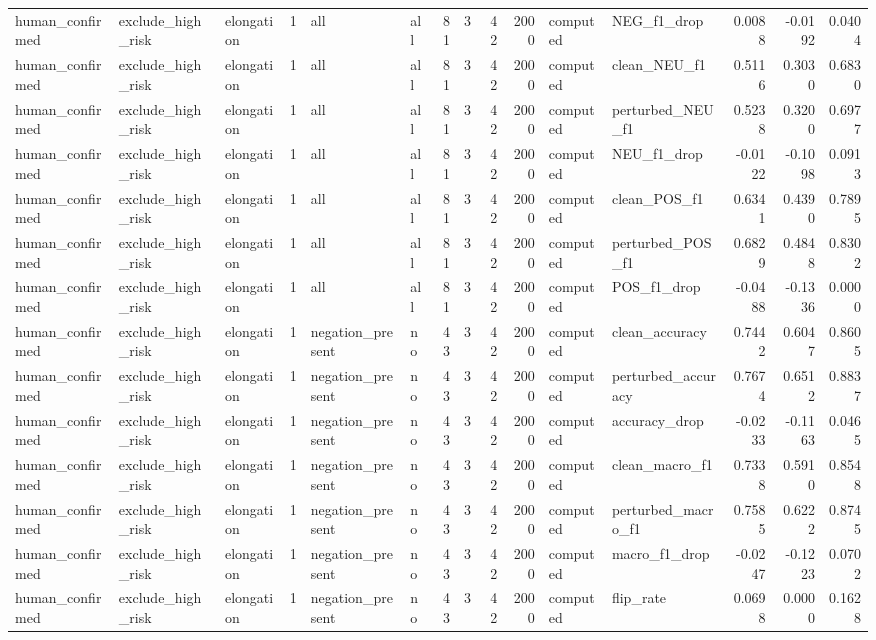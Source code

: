 \begin{tabular}{lllrllrrrrllrrr}
human_confirmed & exclude_high_risk & elongation & 1 & all & all & 81 & 3 & 42 & 2000 & computed & NEG_f1_drop & 0.0088 & -0.0192 & 0.0404 \\
human_confirmed & exclude_high_risk & elongation & 1 & all & all & 81 & 3 & 42 & 2000 & computed & clean_NEU_f1 & 0.5116 & 0.3030 & 0.6830 \\
human_confirmed & exclude_high_risk & elongation & 1 & all & all & 81 & 3 & 42 & 2000 & computed & perturbed_NEU_f1 & 0.5238 & 0.3200 & 0.6977 \\
human_confirmed & exclude_high_risk & elongation & 1 & all & all & 81 & 3 & 42 & 2000 & computed & NEU_f1_drop & -0.0122 & -0.1098 & 0.0913 \\
human_confirmed & exclude_high_risk & elongation & 1 & all & all & 81 & 3 & 42 & 2000 & computed & clean_POS_f1 & 0.6341 & 0.4390 & 0.7895 \\
human_confirmed & exclude_high_risk & elongation & 1 & all & all & 81 & 3 & 42 & 2000 & computed & perturbed_POS_f1 & 0.6829 & 0.4848 & 0.8302 \\
human_confirmed & exclude_high_risk & elongation & 1 & all & all & 81 & 3 & 42 & 2000 & computed & POS_f1_drop & -0.0488 & -0.1336 & 0.0000 \\
human_confirmed & exclude_high_risk & elongation & 1 & negation_present & no & 43 & 3 & 42 & 2000 & computed & clean_accuracy & 0.7442 & 0.6047 & 0.8605 \\
human_confirmed & exclude_high_risk & elongation & 1 & negation_present & no & 43 & 3 & 42 & 2000 & computed & perturbed_accuracy & 0.7674 & 0.6512 & 0.8837 \\
human_confirmed & exclude_high_risk & elongation & 1 & negation_present & no & 43 & 3 & 42 & 2000 & computed & accuracy_drop & -0.0233 & -0.1163 & 0.0465 \\
human_confirmed & exclude_high_risk & elongation & 1 & negation_present & no & 43 & 3 & 42 & 2000 & computed & clean_macro_f1 & 0.7338 & 0.5910 & 0.8548 \\
human_confirmed & exclude_high_risk & elongation & 1 & negation_present & no & 43 & 3 & 42 & 2000 & computed & perturbed_macro_f1 & 0.7585 & 0.6222 & 0.8745 \\
human_confirmed & exclude_high_risk & elongation & 1 & negation_present & no & 43 & 3 & 42 & 2000 & computed & macro_f1_drop & -0.0247 & -0.1223 & 0.0702 \\
human_confirmed & exclude_high_risk & elongation & 1 & negation_present & no & 43 & 3 & 42 & 2000 & computed & flip_rate & 0.0698 & 0.0000 & 0.1628 \\

\end{tabular}
